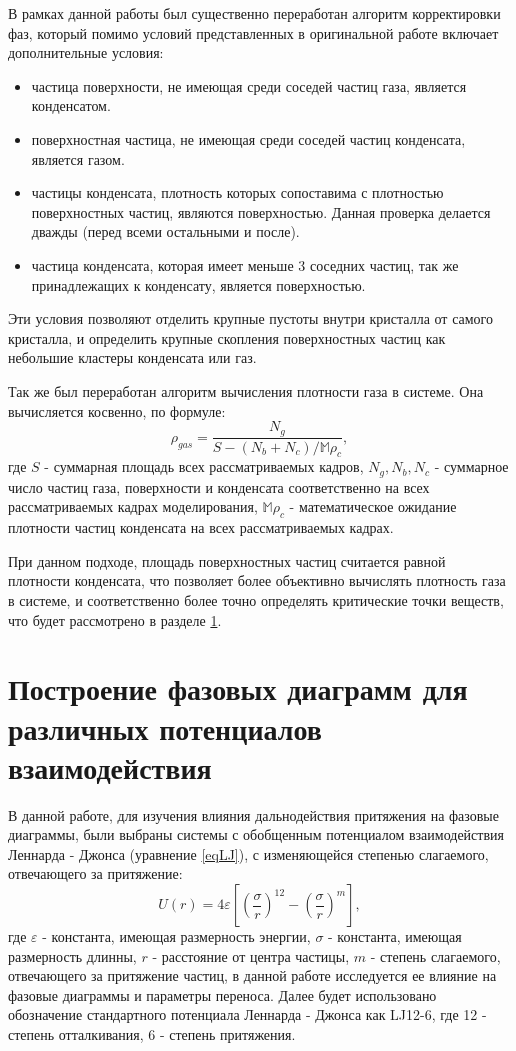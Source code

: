 В рамках данной работы был существенно переработан алгоритм корректировки фаз, который помимо условий представленных в оригинальной работе включает дополнительные условия:
\begin{itemize}
\item частица поверхности, не имеющая среди соседей частиц газа, является конденсатом.
\item поверхностная частица, не имеющая среди соседей частиц конденсата, является газом.
\item частицы конденсата, плотность которых сопоставима с плотностью поверхностных частиц, являются поверхностью. Данная проверка делается дважды (перед всеми остальными и после).
\item частица конденсата, которая имеет меньше 3 соседних частиц, так же принадлежащих к конденсату, является поверхностью.
\end{itemize}
Эти условия позволяют отделить крупные пустоты внутри кристалла от самого кристалла, и определить крупные скопления поверхностных частиц как небольшие кластеры конденсата или газ.

Так же был переработан алгоритм вычисления плотности газа в системе. Она вычисляется косвенно, по формуле:
\begin{equation}
\rho_{gas} = \frac{N_{g}}{S - (N_{b} + N_{c}) / \mathbb{M}\rho_c},
\label{eqGas}
\end{equation}
где $S$ - суммарная площадь всех рассматриваемых кадров, $N_g, N_b, N_c$ - суммарное число частиц газа, поверхности и конденсата соответственно на всех рассматриваемых кадрах моделирования, $\mathbb{M}\rho_c$ - математическое ожидание плотности частиц конденсата на всех рассматриваемых кадрах.

При данном подходе, площадь поверхностных частиц считается равной плотности конденсата, что позволяет более объективно вычислять плотность газа в системе, и соответственно более точно определять критические точки веществ, что будет рассмотрено в разделе \ref{C2_2}.

\section{Построение фазовых диаграмм для различных потенциалов взаимодействия}\label{C2_2}

В данной работе, для изучения влияния дальнодействия притяжения на фазовые диаграммы, были выбраны системы с обобщенным потенциалом взаимодействия Леннарда - Джонса (уравнение \ref{eqLJ}), с изменяющейся степенью слагаемого, отвечающего за притяжение:
\begin{equation}
U(r) = 4\varepsilon \left[ \left(\frac{\sigma}{r}\right)^{12} - \left(\frac{\sigma}{r}\right)^{m} \right],
\label{eqLJ}
\end{equation}
где $\varepsilon$ - константа, имеющая размерность энергии, $\sigma$ - константа, имеющая размерность длинны, $r$ - расстояние от центра частицы, $m$ - степень слагаемого, отвечающего за притяжение частиц, в данной работе исследуется ее влияние на фазовые диаграммы и параметры переноса. Далее будет использовано обозначение стандартного потенциала Леннарда - Джонса как LJ12-6, где 12 - степень отталкивания, 6 - степень притяжения.

